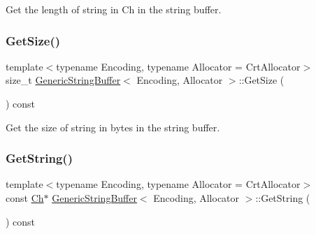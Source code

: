 Get the length of string in Ch in the string buffer. 

\mbox{\label{classGenericStringBuffer_a725e862b9a78375f5363b0b61ad789f3}} 
\subsubsection{\texorpdfstring{Get\+Size()}{GetSize()}}
{\footnotesize\ttfamily template$<$typename Encoding, typename Allocator = Crt\+Allocator$>$ \\
size\+\_\+t \hyperlink{classGenericStringBuffer}{Generic\+String\+Buffer}$<$ Encoding, Allocator $>$\+::Get\+Size (\begin{DoxyParamCaption}{ }\end{DoxyParamCaption}) const\hspace{0.3cm}{\ttfamily [inline]}}



Get the size of string in bytes in the string buffer. 

\mbox{\label{classGenericStringBuffer_ab06b8c5f1385bd3dfd4caea8b7510f0b}} 
\subsubsection{\texorpdfstring{Get\+String()}{GetString()}}
{\footnotesize\ttfamily template$<$typename Encoding, typename Allocator = Crt\+Allocator$>$ \\
const \hyperlink{classGenericStringBuffer_a735b75db076ffe86d0d294be49655d46}{Ch}$\ast$ \hyperlink{classGenericStringBuffer}{Generic\+String\+Buffer}$<$ Encoding, Allocator $>$\+::Get\+String (\begin{DoxyParamCaption}{ }\end{DoxyParamCaption}) const\hspace{0.3cm}{\ttfamily [inline]}}

\mbox{\label{classGenericStringBuffer_a09937913fd2f426be04ae6d6a8abb0f6}} 
